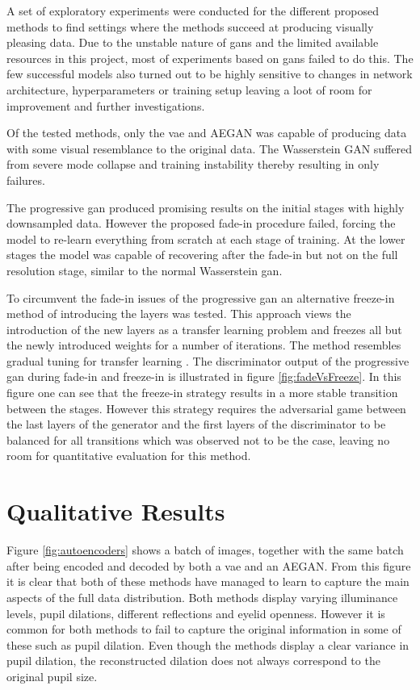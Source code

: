 A set of exploratory experiments were conducted for the different proposed methods to find settings where the methods succeed at producing visually pleasing data. Due to the unstable nature of \acrshort{gans} and the limited available resources in this project, most of experiments based on \acrshort{gans} failed to do this. The few successful models also turned out to be highly sensitive to changes in network architecture, hyperparameters or training setup leaving a loot of room for improvement and further investigations. 

Of the tested methods, only the \acrshort{vae} and AEGAN was capable of producing data with some visual resemblance to the original data. The Wasserstein GAN suffered from severe mode collapse and training instability thereby resulting in only failures.

The progressive \acrshort{gan} produced promising results on the initial stages with highly downsampled data. However the proposed fade-in procedure failed, forcing the model to re-learn everything from scratch at each stage of training. At the lower stages the model was capable of recovering after the fade-in but not on the full resolution stage, similar to the normal Wasserstein \acrshort{gan}. 

To circumvent the fade-in issues of the progressive \acrshort{gan} an alternative freeze-in method of introducing the layers was tested. This approach views the introduction of the new layers as a transfer learning problem and freezes all but the newly introduced weights for a number of iterations. The method resembles gradual tuning for transfer learning \parencite{montone2017gradual}. The discriminator output of the progressive \acrshort{gan} during fade-in and freeze-in is illustrated in figure \ref{fig:fadeVsFreeze}. In this figure one can see that the freeze-in strategy results in a more stable transition between the stages. However this strategy requires the adversarial game between the last layers of the generator and the first layers of the discriminator to be balanced for all transitions which was observed not to be the case, leaving no room for quantitative evaluation for this method.

\section{Qualitative Results}
Figure \ref{fig:autoencoders} shows a batch of images, together with the same batch after being encoded and decoded by both a \acrshort{vae} and an AEGAN. From this figure it is clear that both of these methods have managed to learn to capture the main aspects of the full data distribution. Both methods display varying illuminance levels, pupil dilations, different reflections and eyelid openness. However it is common for both methods to fail to capture the original information in some of these such as pupil dilation. Even though the methods display a clear variance in pupil dilation, the reconstructed dilation does not always correspond to the original pupil size.

